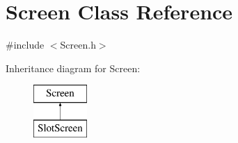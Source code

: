 \hypertarget{classScreen}{\section{Screen Class Reference}
\label{classScreen}
}


{\ttfamily \#include $<$Screen.\-h$>$}

Inheritance diagram for Screen\-:\begin{figure}[H]
\begin{center}
\leavevmode
\includegraphics[height=2.000000cm]{classScreen}
\end{center}
\end{figure}
